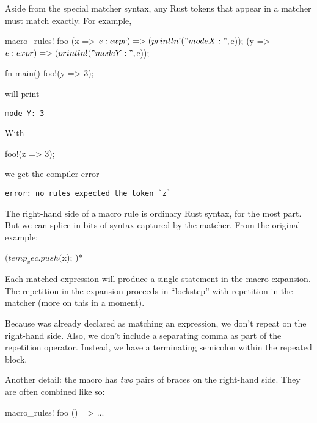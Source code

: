 \blank

Aside from the special matcher syntax, any Rust tokens that appear in a matcher must match exactly. For example,

\begin{rustc}
macro_rules! foo {
    (x => $e:expr) => (println!("mode X: {}", $e));
    (y => $e:expr) => (println!("mode Y: {}", $e));
}

fn main() {
    foo!(y => 3);
}
\end{rustc}

will print

\begin{verbatim}
mode Y: 3
\end{verbatim}

With

\begin{rustc}
foo!(z => 3);
\end{rustc}

we get the compiler error

\begin{verbatim}
error: no rules expected the token `z`
\end{verbatim}


The right-hand side of a macro rule is ordinary Rust syntax, for the most part. But we can splice in bits of syntax captured by the matcher. 
From the original example:

\begin{rustc}
$(
    temp_vec.push($x);
)*
\end{rustc}

Each matched expression  will produce a single  statement in the macro expansion. The repetition in the expansion 
proceeds in \enquote{lockstep} with repetition in the matcher (more on this in a moment).

\blank

Because  was already declared as matching an expression, we don't repeat  on the right-hand side. Also, we don't 
include a separating comma as part of the repetition operator. Instead, we have a terminating semicolon within the repeated block.

\blank

Another detail: the  macro has \emph{two} pairs of braces on the right-hand side. They are often combined like so:

\begin{rustc}
macro_rules! foo {
    () => {{
        ...
    }}
}
\end{rustc}

